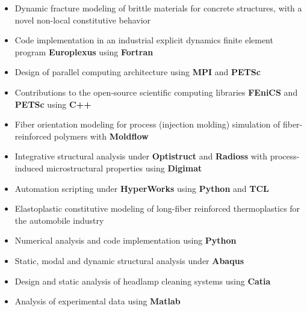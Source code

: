 \documentclass[10pt,a4paper]{altacv}
\begin{document}
\begin{itemize}
\item Dynamic fracture modeling of brittle materials for concrete structures, with a novel non-local constitutive behavior
\item Code implementation in an industrial explicit dynamics finite element program \textbf{Europlexus} using \textbf{Fortran}
\item Design of parallel computing architecture using \textbf{MPI} and \textbf{PETSc}
\item Contributions to the open-source scientific computing libraries \textbf{FEniCS} and \textbf{PETSc} using \textbf{C++}
\end{itemize}

\divider

\begin{itemize}
\item Fiber orientation modeling for process (injection molding) simulation of fiber-reinforced polymers with \textbf{Moldflow}
\item Integrative structural analysis under \textbf{Optistruct} and \textbf{Radioss} with process-induced microstructural properties using \textbf{Digimat}
\item Automation scripting under \textbf{HyperWorks} using \textbf{Python} and \textbf{TCL}
\end{itemize}

\divider

\begin{itemize}
\item Elastoplastic constitutive modeling of long-fiber reinforced thermoplastics for the automobile industry
\item Numerical analysis and code implementation using \textbf{Python}
\item Static, modal and dynamic structural analysis under \textbf{Abaqus}
\end{itemize}

\divider

\begin{itemize}
\item Design and static analysis of headlamp cleaning systems using \textbf{Catia}
\item Analysis of experimental data using \textbf{Matlab}
\end{itemize}
\end{document}
